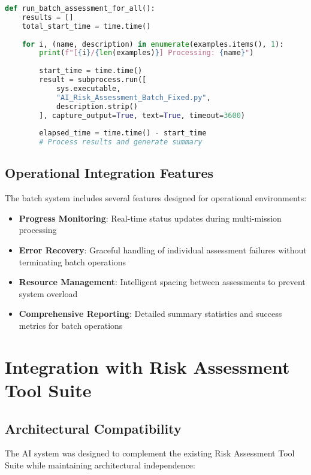 \documentclass[binding=0.6cm]{sapthesis}
\begin{document}
\begin{lstlisting}[language=Python, caption=Batch Processing Implementation]
def run_batch_assessment_for_all():
    results = []
    total_start_time = time.time()
    
    for i, (name, description) in enumerate(examples.items(), 1):
        print(f"[{i}/{len(examples)}] Processing: {name}")
        
        start_time = time.time()
        result = subprocess.run([
            sys.executable, 
            "AI_Risk_Assessment_Batch_Fixed.py",
            description.strip()
        ], capture_output=True, text=True, timeout=3600)
        
        elapsed_time = time.time() - start_time
        # Process results and generate summary
\end{lstlisting}

\subsection{Operational Integration Features}

The batch system includes several features designed for operational environments:

\begin{itemize}
    \item \textbf{Progress Monitoring}: Real-time status updates during multi-mission processing
    \item \textbf{Error Recovery}: Graceful handling of individual assessment failures without terminating batch operations
    \item \textbf{Resource Management}: Intelligent spacing between assessments to prevent system overload
    \item \textbf{Comprehensive Reporting}: Detailed summary statistics and success metrics for batch operations
\end{itemize}

\section{Integration with Risk Assessment Tool Suite}

\subsection{Architectural Compatibility}

The AI system was designed to complement the existing Risk Assessment Tool Suite while maintaining architectural independence:
\end{document}
